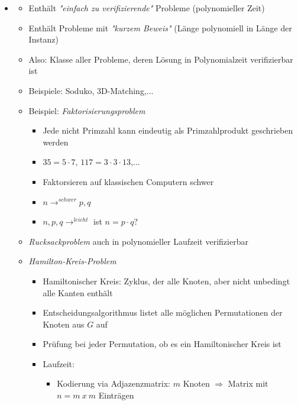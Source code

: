 \documentclass[
    12pt,
    a4paper,
    ngerman,
    color=3b,%
    marginpar=false,
    colorback=false,
    leqno,
]{tudaexercise}
\begin{document}
\begin{itemize}
    \item {}
          \begin{itemize}
              \item Enthält \textit{\string"einfach zu verifizierende\string"} Probleme (polynomieller Zeit)
              \item Enthält Probleme mit \textit{\string"kurzem Beweis\string"} (Länge polynomiell in Länge der Instanz)
              \item Also: Klasse aller Probleme, deren Lösung in Polynomialzeit verifizierbar ist
              \item Beispiele: Soduko, 3D-Matching,...
              \item Beispiel: \textit{Faktorisierungsproblem}
                    \begin{itemize}
                        \item Jede nicht Primzahl kann eindeutig als Primzahlprodukt geschrieben werden
                        \item $35 = 5 \cdot 7$, $117 = 3 \cdot 3 \cdot 13$,...
                        \item Faktorsieren auf klassischen Computern schwer
                        \item $n \longrightarrow^{schwer} p,q$
                        \item $n,p,q \longrightarrow^{leicht}$ ist $n = p \cdot q?$
                    \end{itemize}
              \item \textit{Rucksackproblem} auch in polynomieller Laufzeit verifizierbar
                    \clearpage
              \item \textit{Hamilton-Kreis-Problem}
                    \begin{itemize}
                        \item Hamiltonischer Kreis: Zyklus, der alle Knoten, aber nicht unbedingt alle Kanten enthält
                        \item Entscheidungsalgorithmus listet alle möglichen Permutationen der Knoten aus $G$ auf
                        \item Prüfung bei jeder Permutation, ob es ein Hamiltonischer Kreis ist
                        \item Laufzeit:
                              \begin{itemize}
                                  \item Kodierung via Adjazenzmatrix: $m$ Knoten $\Rightarrow$ Matrix mit $n = m~x~m$ Einträgen

\end{itemize}
\end{itemize}
\end{itemize}
\end{itemize}
\end{document}

